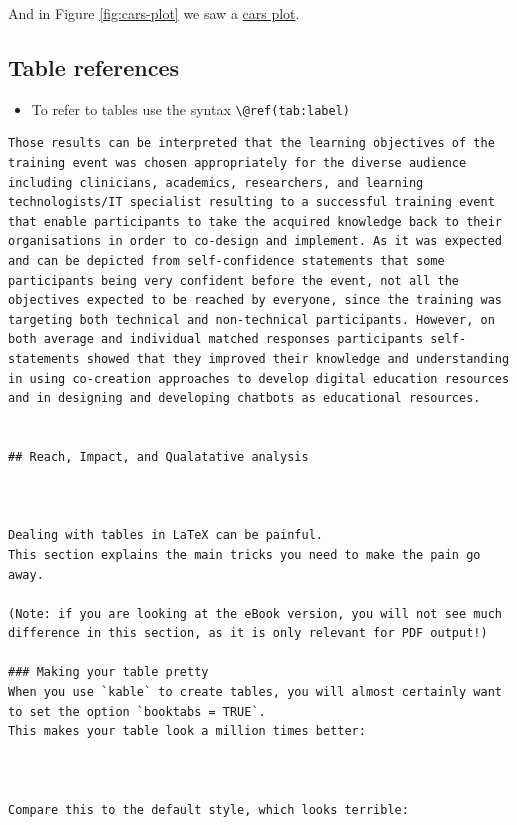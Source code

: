 \documentclass[a4paper, nobind]{templates/ociamthesis}
\providecommand{\tightlist}{%
  \setlength{\itemsep}{0pt}\setlength{\parskip}{0pt}}
\begin{document}
And in Figure \ref{fig:cars-plot} we saw a \protect\hyperlink{fig:cars-plot}{cars plot}.

\hypertarget{table-references}{%
\subsection{Table references}\label{table-references}}

\begin{itemize}
\tightlist
\item
  To refer to tables use the syntax \texttt{\textbackslash{}@ref(tab:label)}
\end{itemize}

\begin{verbatim}
Those results can be interpreted that the learning objectives of the training event was chosen appropriately for the diverse audience including clinicians, academics, researchers, and learning technologists/IT specialist resulting to a successful training event that enable participants to take the acquired knowledge back to their organisations in order to co-design and implement. As it was expected and can be depicted from self-confidence statements that some participants being very confident before the event, not all the objectives expected to be reached by everyone, since the training was targeting both technical and non-technical participants. However, on both average and individual matched responses participants self-statements showed that they improved their knowledge and understanding in using co-creation approaches to develop digital education resources and in designing and developing chatbots as educational resources.


## Reach, Impact, and Qualatative analysis 



Dealing with tables in LaTeX can be painful.
This section explains the main tricks you need to make the pain go away.

(Note: if you are looking at the eBook version, you will not see much difference in this section, as it is only relevant for PDF output!)

### Making your table pretty
When you use `kable` to create tables, you will almost certainly want to set the option `booktabs = TRUE`.
This makes your table look a million times better:



Compare this to the default style, which looks terrible:




\end{verbatim}
\end{document}

